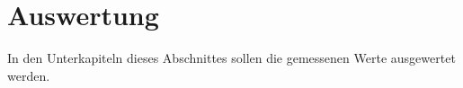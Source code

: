 \section{Auswertung}
\label{auswertung.tex}
In den Unterkapiteln dieses Abschnittes sollen die gemessenen Werte ausgewertet werden.